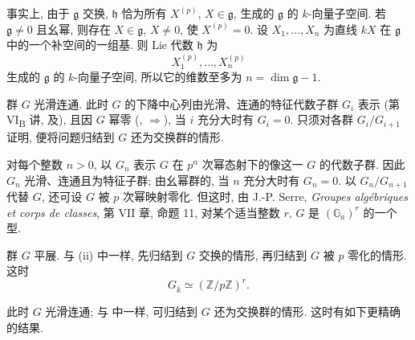 
事实上, 由于 \(\mathfrak g\) 交换, \(\mathfrak h\) 恰为所有 \(X^{(p)}\),
\(X\in\mathfrak g\), 生成的 \(\mathfrak g\) 的 \(k\)-向量子空间.
若 \(\mathfrak g\ne0\) 且幺幂, 则存在 \(X\in\mathfrak g\), \(X\ne0\), 使 \(X^{(p)}=0\).
设 \(X_1,\ldots,X_n\) 为直线 \(kX\) 在 \(\mathfrak g\) 中的一个补空间的一组基.
则 Lie 代数 \(\mathfrak h\) 为
\[
  X_1^{(p)},\ldots,X_n^{(p)}
\]
生成的 \(\mathfrak g\) 的 \(k\)-向量子空间,
所以它的维数至多为 \(n=\dim\mathfrak g-1\).

群 \(G\) 光滑连通. 此时 \(G\) 的下降中心列由光滑、连通的特征代数子群 \(G_i\) 表示
(第 VI\textsubscript{B} 讲,  及),
且因 \(G\) 幂零
(,
\(\Rightarrow\)),
当 \(i\) 充分大时有 \(G_i=0\).
只须对各群 \(G_i/G_{i+1}\) 证明,
便将问题归结到 \(G\) 还为交换群的情形.

对每个整数 \(n>0\), 以 \(G_n\) 表示 \(G\) 在 \(p^n\) 次幂态射下的像这一 \(G\) 的代数子群.
因此 \(G_n\) 光滑、连通且为特征子群; 由幺幂群的,
当 \(n\) 充分大时有 \(G_n=0\). 以 \(G_n/G_{n+1}\) 代替 \(G\),
还可设 \(G\) 被 \(p\) 次幂映射零化.
但这时, 由 J.-P. Serre, \emph{Groupes algébriques et corps de classes}, 第 VII 章, 命题 11,
对某个适当整数 \(r\), \(G\) 是 \((\mathbb G_a)^r\) 的一个型.

群 \(G\) 平展. 与 (ii) 中一样, 先归结到 \(G\) 交换的情形,
再归结到 \(G\) 被 \(p\) 零化的情形. 这时
\[
  G_{\overline{k}}\simeq(\mathbb Z/p\mathbb Z)^r.
\]

此时 \(G\) 光滑连通; 与 中一样,
可归结到 \(G\) 还为交换群的情形. 这时有如下更精确的结果.

